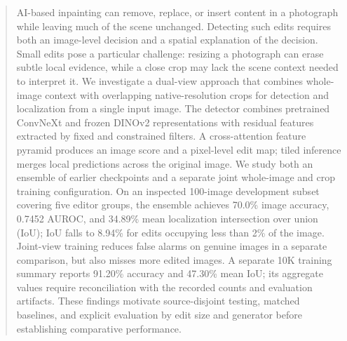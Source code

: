 \begin{abstract}
AI-based inpainting can remove, replace, or insert content in a photograph while leaving much of the scene unchanged. Detecting such edits requires both an image-level decision and a spatial explanation of the decision. Small edits pose a particular challenge: resizing a photograph can erase subtle local evidence, while a close crop may lack the scene context needed to interpret it. We investigate a dual-view approach that combines whole-image context with overlapping native-resolution crops for detection and localization from a single input image. The detector combines pretrained ConvNeXt and frozen DINOv2 representations with residual features extracted by fixed and constrained filters. A cross-attention feature pyramid produces an image score and a pixel-level edit map; tiled inference merges local predictions across the original image. We study both an ensemble of earlier checkpoints and a separate joint whole-image and crop training configuration. On an inspected 100-image development subset covering five editor groups, the ensemble achieves 70.0\% image accuracy, 0.7452 AUROC, and 34.89\% mean localization intersection over union (IoU); IoU falls to 8.94\% for edits occupying less than 2\% of the image. Joint-view training reduces false alarms on genuine images in a separate comparison, but also misses more edited images. A separate 10K training summary reports 91.20\% accuracy and 47.30\% mean IoU; its aggregate values require reconciliation with the recorded counts and evaluation artifacts. These findings motivate source-disjoint testing, matched baselines, and explicit evaluation by edit size and generator before establishing comparative performance.
\end{abstract}
